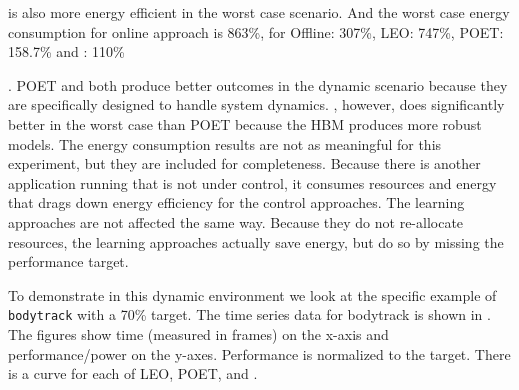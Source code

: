\SYSTEM{} is also more energy efficient in the worst case scenario. And the worst case energy consumption for online approach is 863\%, for  Offline: 307\%,  LEO: 747\%, POET: 158.7\% and \SYSTEM{}: 110\%

. POET and \SYSTEM{} both produce better outcomes in the
dynamic scenario because they are specifically designed to handle
system dynamics.  \SYSTEM{}, however, does significantly better in the
worst case than POET because the HBM produces more robust models.
The energy consumption results are not as meaningful for this
experiment, but they are included for completeness.  Because there is
another application running that is not under control, it consumes
resources and energy that drags down energy efficiency for the control
approaches.  The learning approaches are not affected the same way.
Because they do not re-allocate resources, the learning approaches
actually save energy, but do so by missing the performance target.



To demonstrate \SYSTEM{} in this dynamic environment we look at the
specific example of \texttt{bodytrack} with a 70\% target.  The time
series data for bodytrack is shown in .
The figures show time (measured in frames) on the x-axis and
performance/power on the y-axes.  Performance is normalized to the
target.  There is a curve for each of LEO, POET, and \SYSTEM{}.


